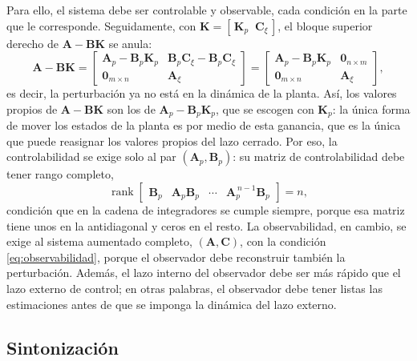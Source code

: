 Para ello, el sistema debe ser controlable y observable, cada condición en la
parte que le corresponde. Seguidamente, con $\mathbf{K} = [\,\mathbf{K}_p \;\; \mathbf{C}_{\xi}\,]$,
el bloque superior derecho de $\mathbf{A} - \mathbf{B}\mathbf{K}$ se anula:
\begin{equation}
\mathbf{A} - \mathbf{B}\mathbf{K} =
\begin{bmatrix} \mathbf{A}_p - \mathbf{B}_p\mathbf{K}_p & \mathbf{B}_p\mathbf{C}_{\xi} - \mathbf{B}_p\mathbf{C}_{\xi} \\ \mathbf{0}_{m\times n} & \mathbf{A}_{\xi} \end{bmatrix}
=
\begin{bmatrix} \mathbf{A}_p - \mathbf{B}_p\mathbf{K}_p & \mathbf{0}_{n\times m} \\ \mathbf{0}_{m\times n} & \mathbf{A}_{\xi} \end{bmatrix},
\end{equation}
es decir, la perturbación ya no está en la dinámica de la planta.
Así, los valores propios de $\mathbf{A} - \mathbf{B}\mathbf{K}$ son los de
$\mathbf{A}_p - \mathbf{B}_p\mathbf{K}_p$, que se escogen con $\mathbf{K}_p$: la única forma de mover los estados de la planta es por medio de esta
ganancia, que es la única que puede reasignar los valores propios del lazo cerrado. Por eso, la
controlabilidad se exige solo al par $(\mathbf{A}_p, \mathbf{B}_p)$: su matriz de
controlabilidad debe tener rango completo,
\begin{equation}
\operatorname{rank}
\begin{bmatrix} \mathbf{B}_p & \mathbf{A}_p\mathbf{B}_p & \cdots & \mathbf{A}_p^{\,n-1}\mathbf{B}_p \end{bmatrix} = n,
\end{equation}
condición que en la cadena de integradores se cumple siempre, porque esa matriz
tiene unos en la antidiagonal y ceros en el resto. La observabilidad, en cambio,
se exige al sistema aumentado completo, $(\mathbf{A}, \mathbf{C})$, con la
condición \eqref{eq:observabilidad}, porque el observador debe reconstruir
también la perturbación. Además, el lazo interno del observador debe ser más
rápido que el lazo externo de control; en otras palabras, el observador debe
tener listas las estimaciones antes de que se imponga la dinámica del lazo
externo.

\subsection{Sintonización}
\label{subsec:sintonia}

